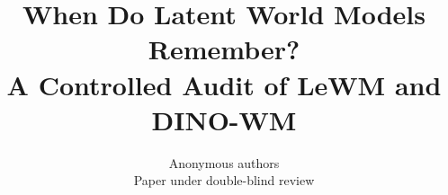 \documentclass{article}
\title{When Do Latent World Models Remember?\\
A Controlled Audit of LeWM and DINO-WM}
\author{Anonymous authors\\Paper under double-blind review}
\begin{document}
\maketitle
\begin{abstract}

\end{abstract}


\label{paper-a-main-end}
\clearpage


\clearpage
\appendix
\raggedbottom

\end{document}
